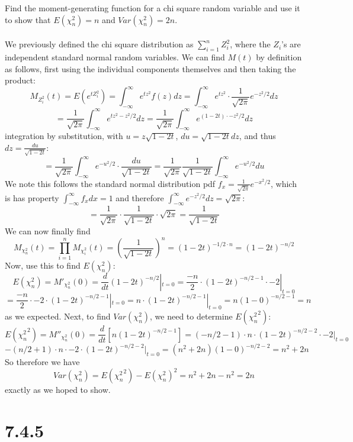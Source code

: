 \documentclass{article}
\begin{document}
{Find the moment-generating function for a chi square random variable and use it to show that \(E (\chi^2_n) = n \) and \(Var(\chi^2_n) = 2n\).
\\
\\
We previously defined the chi square distribution as \(\sum_{i=1}^{n} Z^2_i\), where the \(Z_i\)'s are independent standard normal random variables. We can find \(M(t)\) by definition as follows, first using the individual components themselves and then taking the product:
\[
M_{Z_i^2}(t) = E(e^{tZ_i^2}) = \int_{-\infty}^{\infty} e^{tz^2} f(z) dz  = \int_{-\infty}^{\infty} e^{tz^2} \cdot \frac{1}{\sqrt{2\pi}}e^{-z^2/2} dz
\]
\[
= \frac{1}{\sqrt{2\pi}}\int_{-\infty}^{\infty} e^{tz^2-z^2/2} dz = \frac{1}{\sqrt{2\pi}}\int_{-\infty}^{\infty} e^{(1-2t) \cdot -z^2/2} dz
\]
integration by substitution, with \(u = z\sqrt{1 - 2t}\), \(du = \sqrt{1 - 2t} dz\), and thus \(dz = \frac{du}{\sqrt{1 - 2t}}\):
\[
= \frac{1}{\sqrt{2\pi}} \int_{-\infty}^{\infty} e^{-u^2 / 2} \cdot \frac{du}{\sqrt{1 - 2t}} = \frac{1}{\sqrt{2\pi}} \frac{1}{\sqrt{1 - 2t}} \int_{-\infty}^{\infty} e^{-u^2 / 2} du
\]
We note this follows the standard normal distribution pdf \(f_x = \frac{1}{\sqrt{2\pi}} e^{-x^2 / 2}\), which is has property \(\int_{-\infty}^{\infty} f_x dx = 1\) and therefore \(\int_{-\infty}^{\infty} e^{-z^2 / 2} dz = \sqrt{2\pi}\):
\[
= \frac{1}{\sqrt{2\pi}} \cdot \frac{1}{\sqrt{1 - 2t}} \cdot \sqrt{2\pi} = \frac{1}{\sqrt{1 - 2t}}
\]
We can now finally find
\[
M_{\chi_n^2} (t) = \prod_{i=1}^{n} M_{\chi_i^2} (t) = (\frac{1}{\sqrt{1 - 2t}})^n = (1-2t)^{-1/2 \cdot n} = (1-2t)^{-n/2}
\]
Now, use this to find \(E(\chi^2_n)\):
\[
E(\chi^2_n) = M'_{\chi_n^2} (0) = \frac{d}{dt} (1-2t)^{-n/2} |_{t=0} = \frac{-n}{2} \cdot (1-2t)^{-n/2 - 1} \cdot -2 |_{t=0}
\]
\[
= \frac{-n}{2} \cdot -2 \cdot (1-2t)^{-n/2 - 1} |_{t=0} = n \cdot (1-2t)^{-n/2 - 1} |_{t=0} = n (1 - 0)^{-n/2 - 1} = n
\]
as we expected. Next, to find \(Var(\chi^2_n)\), we need to determine \(E({\chi_n^2}^2)\):
\[
E({\chi_n^2}^2) = M''_{\chi_n^2} (0) = \frac{d}{dt} [n(1-2t)^{-n/2 - 1}] = (-n/2 - 1) \cdot n \cdot (1-2t)^{-n/2 - 2} \cdot -2 |_{t = 0}
\]
\[
-(n/2 + 1) \cdot n \cdot -2 \cdot (1-2t)^{-n/2 - 2} |_{t = 0} = (n^2 + 2n)(1 - 0)^{-n/2 - 2} = n^2 + 2n
\]
So therefore we have 
\[
Var(\chi_n^2) = E({\chi_n^2}^2) - E(\chi_n^2)^2 = n^2 + 2n - n^2 = 2n
\]
exactly as we hoped to show.

\section*{7.4.5}

}
\end{document}
